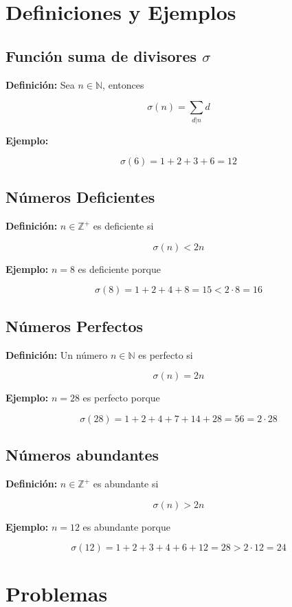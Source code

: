 \documentclass[a4paper]{article}
\begin{document}
\section{Definiciones y Ejemplos}

\subsection{Función suma de divisores $\sigma$}

\textbf{Definición:} Sea $n\in\mathbb{N}$, entonces

$$\sigma(n) = \sum_{d|n}d$$

\textbf{Ejemplo:}

$$\sigma(6) = 1+2+3+6 = 12$$

\subsection{Números Deficientes}
\textbf{Definición:} $n\in\mathbb{Z}^+$ es deficiente si

$$\sigma(n)<2n$$

\textbf{Ejemplo:} $n=8$ es deficiente porque

$$\sigma(8) = 1+2+4+8 = 15 <2\cdot 8 = 16$$

\subsection{Números Perfectos}

\textbf{Definición:} Un número $n\in\mathbb{N}$ es perfecto si

$$\sigma(n) = 2n$$

\textbf{Ejemplo:} $n=28$ es perfecto porque

$$\sigma(28) = 1+2+4+7+14+28 = 56 = 2\cdot 28$$

\subsection{Números abundantes}

\textbf{Definición:} $n\in\mathbb{Z}^+$ es abundante si

$$\sigma(n)>2n$$

\textbf{Ejemplo:} $n = 12$ es abundante porque

$$\sigma(12) = 1+2+3+4+6+12 = 28 >2\cdot 12 = 24$$

\section{Problemas}
\end{document}
